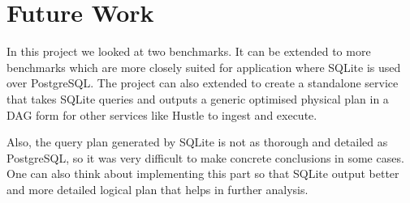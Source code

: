 \section{Future Work}
\label{sec:future}
In this project we looked at two benchmarks. It can be extended to more benchmarks which are more closely suited for application where SQLite is used over PostgreSQL. The project can also extended to create a standalone service that takes SQLite queries and outputs a generic optimised physical plan in a DAG form for other services like Hustle to ingest and execute. 

Also, the query plan generated by SQLite is not as thorough and detailed as PostgreSQL, so it was very difficult to make concrete conclusions in some cases. One can also think about implementing this part so that SQLite output better and more detailed logical plan that helps in further analysis.
